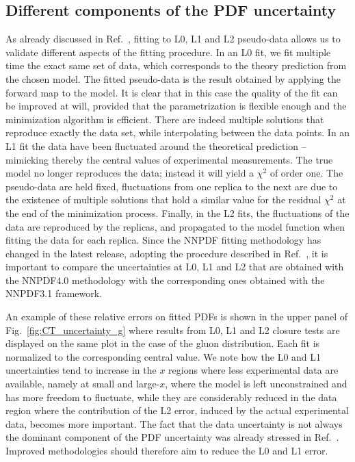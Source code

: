 \subsection{Different components of the PDF uncertainty}

As already discussed in Ref.~\cite{nnpdf30}, fitting to L0, L1 and L2
pseudo-data allows us to validate different aspects of the fitting procedure. In
an L0 fit, we fit multiple time the exact same set of data, which corresponds to
the theory prediction from the chosen model. The fitted pseudo-data is the
result obtained by applying the forward map to the model. It is clear that in
this case the quality of the fit can be improved at will, provided that the
parametrization is flexible enough and the minimization algorithm is efficient.
There are indeed multiple solutions that reproduce exactly the data set, while
interpolating between the data points. In an L1 fit the data have been
fluctuated around the theoretical prediction -- mimicking thereby the central
values of experimental measurements. The true model no longer reproduces the
data; instead it will yield a $\chi^2$ of order one. The pseudo-data are held
fixed, fluctuations from one replica to the next are due to the existence of
multiple solutions that hold a similar value for the residual $\chi^2$ at the
end of the minimization process. Finally, in the L2 fits, the fluctuations of
the data are reproduced by the replicas, and propagated to the model function
when fitting the data for each replica. Since the NNPDF fitting methodology has
changed in the latest release, adopting the procedure described in
Ref.~\cite{Carrazza:2019mzf}, it is important to compare the uncertainties at
L0, L1 and L2 that are obtained with the NNPDF4.0 methodology with the
corresponding ones obtained with the NNPDF3.1 framework.

An example of these relative errors on fitted PDFs is shown in the upper panel of
Fig.~\ref{fig:CT_uncertainty_g} where results from L0, L1 and L2 closure tests
are displayed on the same plot in the case of the gluon distribution. Each fit
is normalized to the corresponding central value. We note how the L0 and L1
uncertainties tend to increase in the $x$ regions where less experimental data
are available, namely at small and large-$x$, where the model is left
unconstrained and has more freedom to fluctuate, while they are considerably
reduced in the data region where the contribution of the L2 error, induced by
the actual experimental data, becomes more important. The fact that the data
uncertainty is not always the dominant component of the PDF uncertainty was
already stressed in Ref.~\cite{nnpdf30}. Improved methodologies should therefore
aim to reduce the L0 and L1 error. 

